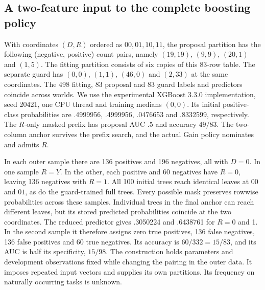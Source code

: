 \subsection{A two-feature input to the complete boosting policy}
\label{sec:boosted-example}
With coordinates $(D,R)$ ordered as $00,01,10,11$, the proposal partition has the following (negative, positive) count pairs, namely $(19,19)$, $(9,9)$, $(20,1)$ and $(1,5)$. The fitting partition consists of six copies of this 83-row table. The separate guard has $(0,0)$, $(1,1)$, $(46,0)$ and $(2,33)$ at the same coordinates. The 498 fitting, 83 proposal and 83 guard labels and predictors coincide across worlds. We use the experimental XGBoost 3.3.0 implementation, seed 20421, one CPU thread and training medians $(0,0)$. Its initial positive-class probabilities are .4999956, .4999956, .0476653 and .8332599, respectively. The $R$-only masked prefix has proposal AUC .5 and accuracy $49/83$. The two-column anchor survives the prefix search, and the actual Gain policy nominates and admits $R$.

In each outer sample there are 136 positives and 196 negatives, all with $D=0$. In one sample $R=Y$. In the other, each positive and 60 negatives have $R=0$, leaving 136 negatives with $R=1$. All 100 initial trees reach identical leaves at $00$ and $01$, as do the guard-trained full trees. Every possible mask preserves rowwise probabilities across these samples. Individual trees in the final anchor can reach different leaves, but its stored predicted probabilities coincide at the two coordinates. The reduced predictor gives .3050224 and .6438761 for $R=0$ and 1. In the second sample it therefore assigns zero true positives, 136 false negatives, 136 false positives and 60 true negatives. Its accuracy is $60/332=15/83$, and its AUC is half its specificity, $15/98$. The construction holds parameters and development observations fixed while changing the pairing in the outer data. It imposes repeated input vectors and supplies its own partitions. Its frequency on naturally occurring tasks is unknown.
